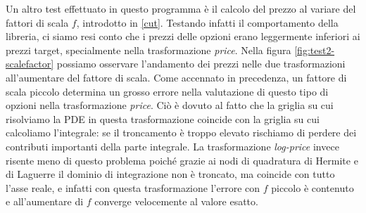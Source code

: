 \documentclass[a4paper,10pt]{report}
\theoremstyle{plain}
\theoremstyle{definition}
\theoremstyle{remark}
\begin{document}
Un altro test effettuato in questo programma \`e il calcolo del prezzo al variare del fattori di scala $f$, introdotto in \eqref{cut}. Testando infatti il comportamento della libreria, ci siamo resi conto che i prezzi delle opzioni erano leggermente inferiori ai prezzi target, specialmente nella trasformazione \emph{price}. Nella figura \ref{fig:test2-scalefactor} possiamo osservare l'andamento dei prezzi nelle due trasformazioni all'aumentare del fattore di scala. Come accennato in precedenza, un fattore di scala piccolo determina un grosso errore nella valutazione di questo tipo di opzioni nella trasformazione \emph{price}. Ci\`o \`e dovuto al fatto che la griglia su cui risolviamo la PDE in questa trasformazione coincide con la griglia su cui calcoliamo l'integrale: se il troncamento \`e troppo elevato rischiamo di perdere dei contributi importanti della parte integrale. La trasformazione \emph{log-price} invece risente meno di questo problema poich\'e grazie ai nodi di quadratura di Hermite e di Laguerre il dominio di integrazione non \`e troncato, ma coincide con tutto l'asse reale, e infatti con questa trasformazione l'errore con $f$ piccolo \`e contenuto e all'aumentare di $f$ converge velocemente al valore esatto.
\end{document}
